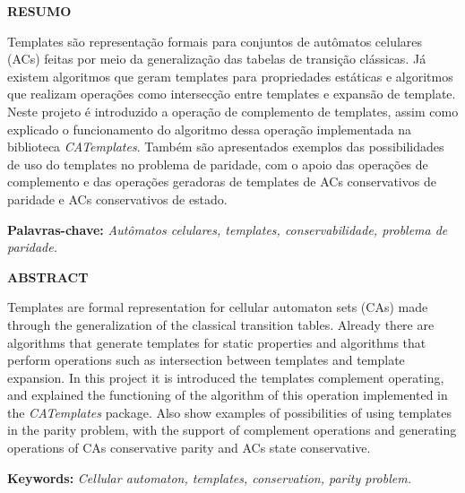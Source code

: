 \documentclass[12pt,a4paper]{article}
\begin{document}
\newpage
\thispagestyle{plain}
\begin{center}
\large  
\textbf{RESUMO}
\end{center}
Templates são representação formais para conjuntos de autômatos celulares (ACs) feitas por meio da generalização das tabelas de transição clássicas. Já existem algoritmos que geram templates para propriedades estáticas e algoritmos que realizam operações como intersecção entre templates e expansão de template. Neste projeto é introduzido a operação de complemento de templates, assim como explicado o funcionamento do algoritmo dessa operação implementada na biblioteca \textit{CATemplates}. Também são apresentados exemplos das possibilidades de uso do templates no problema de paridade, com o apoio das operações de complemento e das operações geradoras de templates de ACs conservativos de paridade e ACs conservativos de estado.
\\[0.5cm]
\begin{flushleft}
{\bf Palavras-chave:} {\it Autômatos celulares, templates, conservabilidade, problema de paridade.}
\end{flushleft}

\newpage
\thispagestyle{plain}
\begin{center}
\large  
\textbf{ABSTRACT}
\end{center}
Templates are formal representation for cellular automaton sets (CAs) made through the generalization of the classical transition tables. Already there are algorithms that generate templates for static properties and algorithms that perform operations such as intersection between templates and template expansion. In this project it is introduced the templates complement operating, and explained the functioning of the algorithm of this operation implemented in the \textit{CATemplates} package. Also show examples of possibilities of using templates in the parity problem, with the support of complement operations and generating operations of CAs conservative parity and ACs state conservative.
\\[0.5cm]
\begin{flushleft}
{\bf Keywords:} {\it Cellular automaton, templates, conservation, parity problem.}
\end{flushleft}

\newpage
\thispagestyle{empty}
\tableofcontents
\end{document}
